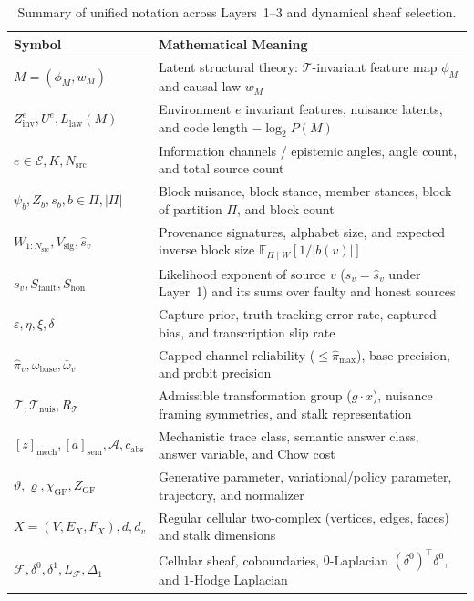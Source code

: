 \documentclass[11pt,a4paper]{article}
\theoremstyle{definition}
\theoremstyle{remark}
\newcommand{\E}{\mathbb{E}}
\begin{document}
\begin{table}[t]
\centering
\caption{Summary of unified notation across Layers~1--3 and dynamical sheaf selection.}
\label{tab:notation}
\small
\begin{tabular}{@{}lp{}@{}}
\toprule
\textbf{Symbol} & \textbf{Mathematical Meaning} \\
\midrule
$M = (\phi_M, w_M)$ & Latent structural theory: $\mathcal{T}$-invariant feature map $\phi_M$ and causal law $w_M$ \\
$Z_{\mathrm{inv}}^e, U^e, L_{\mathrm{law}}(M)$ & Environment $e$ invariant features, nuisance latents, and code length $-\log_2 P(M)$ \\
$e \in \mathcal{E}, K, N_{\mathrm{src}}$ & Information channels / epistemic angles, angle count, and total source count \\
$\psi_b, Z_b, s_b, b \in \Pi, |\Pi|$ & Block nuisance, block stance, member stances, block of partition $\Pi$, and block count \\
$W_{1:N_{\mathrm{src}}}, V_{\mathrm{sig}}, \hat{s}_v$ & Provenance signatures, alphabet size, and expected inverse block size $\E_{\Pi\mid W}[1/|b(v)|]$ \\
$s_v, S_{\mathrm{fault}}, S_{\mathrm{hon}}$ & Likelihood exponent of source $v$ ($s_v = \hat{s}_v$ under Layer~1) and its sums over faulty and honest sources \\
$\varepsilon, \eta, \xi, \delta$ & Capture prior, truth-tracking error rate, captured bias, and transcription slip rate \\
$\hat{\pi}_v, \omega_{\mathrm{base}}, \bar{\omega}_v$ & Capped channel reliability ($\le \hat{\pi}_{\max}$), base precision, and probit precision \\
$\mathcal{T}, \mathcal{T}_{\mathrm{nuis}}, R_{\mathcal{T}}$ & Admissible transformation group ($g \cdot x$), nuisance framing symmetries, and stalk representation \\
$[z]_{\mathrm{mech}}, [a]_{\mathrm{sem}}, \mathcal{A}, c_{\mathrm{abs}}$ & Mechanistic trace class, semantic answer class, answer variable, and Chow cost \\
$\vartheta, \varrho, \chi_{\mathrm{GF}}, Z_{\mathrm{GF}}$ & Generative parameter, variational/policy parameter, trajectory, and normalizer \\
$X = (V, E_X, F_X), d, d_v$ & Regular cellular two-complex (vertices, edges, faces) and stalk dimensions \\
$\mathcal{F}, \delta^0, \delta^1, L_{\mathcal{F}}, \Delta_1$ & Cellular sheaf, coboundaries, $0$-Laplacian $(\delta^0)^\top \delta^0$, and $1$-Hodge Laplacian \\

\end{tabular}
\end{table}
\end{document}
